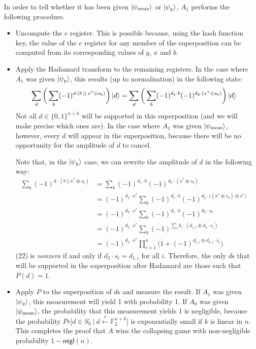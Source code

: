 \documentclass{article}
\begin{document}
In order to tell whether it has been given $\ket{\psi_{\mathrm{meas}}}$ or $\ket{\psi_y}$, $A_1$ performs the following procedure.
\begin{itemize}
    \item Uncompute the $e$ register. This is possible because, using the hash function key, the value of the $e$ register for any member of the superposition can be computed from its corresponding values of $y$, $x$ and $b$.
    \item Apply the Hadamard transform to the remaining registers. In the case where $A_1$ was given $\ket{\psi_y}$, this results (up to normalisation) in the following state:
    \begin{align}
        \sum_d \bigg( \sum_b (-1)^{d \cdot (b \: || \: x^* \oplus s_b)} \bigg) \ket{d} = \sum_d \bigg( \sum_b (-1)^{d_1 \cdot b} (-1)^{d_2 \cdot (x^* \oplus s_{b})} \bigg) \ket{d}
    \end{align}
    Not all $d \in \{0,1\}^{n + k}$ will be supported in this superposition (and we will make precise which ones are). In the case where $A_1$ was given $\ket{\psi_{\mathrm{meas}}}$, however, every $d$ will appear in the superposition, because there will be no opportunity for the amplitude of $d$ to cancel.
    
    Note that, in the $\ket{\psi_y}$ case, we can rewrite the amplitude of $d$ in the following way:
    \begin{align}
        \sum_b (-1)^{d \cdot (b \: || \: x^* \oplus s_b)} &=
			\sum_b (-1)^{d_1 \cdot b} (-1)^{d_2 \cdot (x^* \oplus s_{b})} \\
        &= (-1)^{d_2 \cdot x^*} \sum_b (-1)^{d_1 \cdot b} (-1)^{d_2 \cdot \big( (x^* \oplus s_b) \oplus x^* \big)} \\
			&= (-1)^{d_2 \cdot x^*} \sum_b (-1)^{d_1 \cdot b} (-1)^{d_2 \cdot s_b} \\
			&= (-1)^{d_2 \cdot x^*} \sum_b (-1)^{\sum_i b_i \cdot (d_{1, i} \oplus d_2 \cdot s_i)} \\
			&= (-1)^{d_2 \cdot x^*} \prod_{i = 1}^n \big( 1 + (-1)^{d_{1, i} \oplus d_{2, i} \cdot s_i} \big)
    \end{align}
(22) is \textit{nonzero} if and only if $d_2 \cdot s_i = d_{1, i}$ for all $i$. Therefore, the only $d$s that will be supported in the superposition after Hadamard are those such that $P(d) = 1$.

	\item Apply $P$ to the superposition of $d$s and measure the result. If $A_1$ was given $\ket{\psi_y}$, this measurement will yield 1 with probability 1. If $A_0$ was given $\ket{\psi_{\mathrm{meas}}}$, the probability that this measurement yields 1 is negligible, because the probability $Pr\Big[ d \in S_0 \: \Big| \: d \stackrel{r}{\leftarrow} \mathbb{F}_2^{n+k} \Big]$ is exponentially small if $k$ is linear in $n$. This completes the proof that $A$ wins the collapsing game with non-negligible probability $1 - \textsf{negl}(n)$.
\end{itemize}
\end{document}
